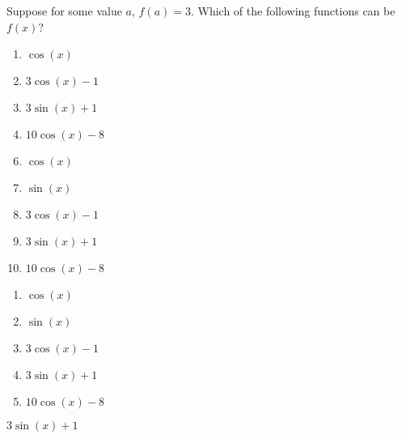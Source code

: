 





  Suppose for some value $a$, $f(a)=3$.  Which of the following functions can be $f(x)$?  



\ifsat
	\begin{enumerate}[label=\Alph*)]
		\item    $\cos(x)$
		\item $3\cos(x)-1$
		\item $3\sin(x)+1$ %
		\item  $10\cos(x)-8$
	\end{enumerate}
\else
\fi

\ifacteven
	\begin{enumerate}[label=\textbf{\Alph*.},itemsep=\fill,align=left]
		\setcounter{enumii}{5}
		\item    $\cos(x)$
		\item  $\sin(x)$ 
		\item $3\cos(x)-1$
		\addtocounter{enumii}{1}
		\item $3\sin(x)+1$ %
		\item  $10\cos(x)-8$
	\end{enumerate}
\else
\fi

\ifactodd
	\begin{enumerate}[label=\textbf{\Alph*.},itemsep=\fill,align=left]
		\item    $\cos(x)$
		\item  $\sin(x)$ 
		\item $3\cos(x)-1$
		\item $3\sin(x)+1$ %
		\item  $10\cos(x)-8$
	\end{enumerate}
\else
\fi

\ifgridin
 $3\sin(x)+1$ %
		
\else
\fi

